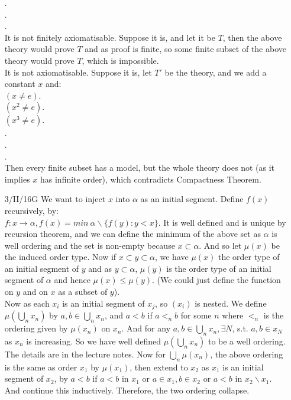 \begin{enumerate}
      .\\
      .\\
      .\\
      It is not finitely axiomatisable. Suppose it is, and let it be $T$, then the above theory would prove $T$ and as proof is finite, so some finite subset of the above theory would prove $T$, which is impossible.\\
      It is not axiomatisable. Suppose it is, let $T'$ be the theory, and we add a constant $x$ and:\\
      $(x \neq e)$.\\
      $(x^2 \neq e)$.\\
      $(x^3 \neq e)$.\\
      .\\
      .\\
      .\\
      Then every finite subset has a model, but the whole theory does not (as it implies $x$ has infinite order), which contradicts Compactness Theorem.\\
\item[3/II/16G] We want to inject $x$ into $\alpha$ as an initial segment. Define $f(x)$ recursively, by:\\
      $f: x \rightarrow \alpha, f(x)=min~\alpha \backslash\{f(y): y < x\}$. It is well defined and is unique by recursion theorem, and we can define the minimum of the above set as $\alpha$ is well ordering and the set is non-empty because $x \subset \alpha$. And so let $\mu(x)$ be the induced order type. Now if $x \subset y \subset \alpha$, we have $\mu(x)$ the order type of an initial segment of $y$ and as $y \subset \alpha$, $\mu(y)$ is the order type of an initial segment of $\alpha$ and hence $\mu(x) \le \mu(y)$. (We could just define the function on $y$ and on $x$ as a subset of $y$).\\
      Now as each $x_i$ is an initial segment of $x_j$, so $(x_i)$ is nested. We define $\mu(\bigcup_n x_n)$ by $a,b \in \bigcup_n x_n$, and $a<b$ if $a <_n b$ for some $n$ where $<_n$ is the ordering given by $\mu(x_n)$ on $x_n$. And for any $a,b \in \bigcup_n x_n, \exists N$, s.t. $a,b \in x_N$ as $x_n$ is increasing. So we have well defined $\mu(\bigcup_n x_n)$ to be a well ordering. The details are in the lecture notes. Now for $\bigcup_n \mu(x_n)$, the above ordering is the same as order $x_1$ by $\mu(x_1)$, then extend to $x_2$ as $x_1$ is an initial segment of $x_2$, by $a<b$ if $a<b$ in $x_1$ or $a \in x_1, b \in x_2$ or $a<b$ in $x_2 \backslash x_1$. And continue this inductively. Therefore, the two ordering collapse.\\

\end{enumerate}
